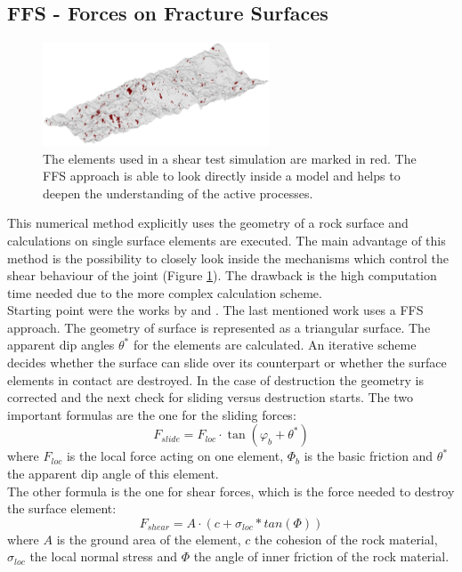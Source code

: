 \subsection{FFS - Forces on Fracture Surfaces}
\label{chap:NumPlatf:FFS}
\begin{figure}[htb!]
\begin{center}
\includegraphics[width=0.6\textwidth]{./figures/FFS_MarkedSurfaceElements.png}
\end{center}
\caption{The elements used in a shear test simulation are marked in red. The FFS approach is able to look directly inside a model and helps to deepen the understanding of the active processes.}
\label{Fig:FFS-MarkedElements}
\end{figure}
This numerical method explicitly uses the geometry of a rock surface and calculations on single surface elements are executed. The main advantage of this method is the possibility to closely look inside the mechanisms which control the shear behaviour of the joint (Figure \ref{Fig:FFS-MarkedElements}). The drawback is the high computation time needed due to the more complex calculation scheme.\\
Starting point were the works by \cite{Fathi2016} and \cite{Casagrande2017}. The last mentioned work uses a FFS approach. The geometry of surface is represented as a triangular surface. The apparent dip angles $\theta^\ast$ for the elements are calculated. An iterative scheme decides whether the surface can slide over its counterpart or whether the surface elements in contact are destroyed. In the case of destruction the geometry is corrected and the next check for sliding versus destruction starts. The two important formulas are the one for the sliding forces: 
\begin{equation}
F_{slide}=F_{loc} \cdot \tan (\varphi_b + \theta^\ast)
\end{equation}
where $F_{loc}$ is the local force acting on one element, $\Phi_b$ is the basic friction and $\theta^\ast$ the apparent dip angle of this element.\\
The other formula is the one for shear forces, which is the force needed to destroy the surface element:
\begin{equation}\label{eq:shear}
F_{shear}=A \cdot (c + \sigma_{loc}*tan(\Phi))
\end{equation}
where $A$ is the ground area of the element, $c$ the cohesion of the rock material, $\sigma_{loc}$ the local normal stress and $\Phi$ the angle of inner friction of the rock material.



